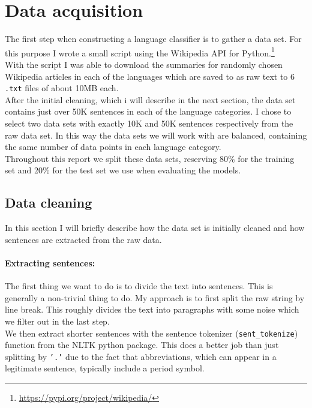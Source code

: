 
\section{Data acquisition}
The first step when constructing a language classifier is to gather a data set. For this purpose I wrote a small script using the Wikipedia API for Python.\footnote{\url{https://pypi.org/project/wikipedia/}}\\

With the script I was able to download the summaries for randomly chosen Wikipedia articles in each of the languages which are saved to as raw text to 6 {\tt .txt} files of about 10MB each.\\

After the initial cleaning, which i will describe in the next section, the data set contains just over 50K sentences in each of the language categories. I chose to select two data sets with exactly 10K and 50K sentences respectively from the raw data set. In this way the data sets we will work with are balanced, containing the same number of data points in each language category.\\

Throughout this report we split these data sets, reserving 80\% for the training set and 20\% for the test set we use when evaluating the models.

\subsection{Data cleaning}
In this section I will briefly describe how the data set is initially cleaned and how sentences are extracted from the raw data.

\paragraph{Extracting sentences:}

The first thing we want to do is to divide the text into sentences.
This is generally a non-trivial thing to do. My approach is to first split the raw string by line break.
This roughly divides the text into paragraphs with some noise which we filter out in the last step.\\

We then extract shorter sentences with the sentence tokenizer ({\tt sent\_tokenize}) function from the NLTK\cite{nltk} python package. This does a better job than just splitting by {\tt '.'} due to the fact that abbreviations, which can appear in a legitimate sentence, typically include a period symbol.

